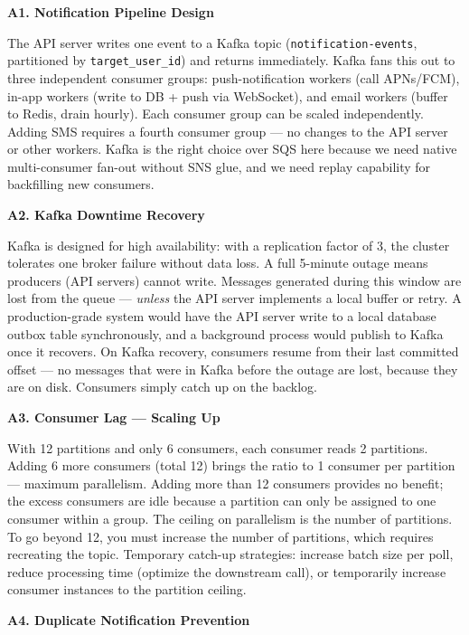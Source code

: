 \documentclass[11pt,a4paper]{article}
\begin{document}
\newpage
\begin{answerbox}
\textbf{A1. Notification Pipeline Design}

The API server writes one event to a Kafka topic (\texttt{notification-events}, partitioned by \texttt{target\_user\_id}) and returns immediately. Kafka fans this out to three independent consumer groups: push-notification workers (call APNs/FCM), in-app workers (write to DB + push via WebSocket), and email workers (buffer to Redis, drain hourly). Each consumer group can be scaled independently. Adding SMS requires a fourth consumer group --- no changes to the API server or other workers. Kafka is the right choice over SQS here because we need native multi-consumer fan-out without SNS glue, and we need replay capability for backfilling new consumers.

\vspace{0.8em}
\textbf{A2. Kafka Downtime Recovery}

Kafka is designed for high availability: with a replication factor of 3, the cluster tolerates one broker failure without data loss. A full 5-minute outage means producers (API servers) cannot write. Messages generated during this window are lost from the queue --- \textit{unless} the API server implements a local buffer or retry. A production-grade system would have the API server write to a local database outbox table synchronously, and a background process would publish to Kafka once it recovers. On Kafka recovery, consumers resume from their last committed offset --- no messages that were in Kafka before the outage are lost, because they are on disk. Consumers simply catch up on the backlog.

\vspace{0.8em}
\textbf{A3. Consumer Lag --- Scaling Up}

With 12 partitions and only 6 consumers, each consumer reads 2 partitions. Adding 6 more consumers (total 12) brings the ratio to 1 consumer per partition --- maximum parallelism. Adding more than 12 consumers provides no benefit; the excess consumers are idle because a partition can only be assigned to one consumer within a group. The ceiling on parallelism is the number of partitions. To go beyond 12, you must increase the number of partitions, which requires recreating the topic. Temporary catch-up strategies: increase batch size per poll, reduce processing time (optimize the downstream call), or temporarily increase consumer instances to the partition ceiling.

\vspace{0.8em}
\textbf{A4. Duplicate Notification Prevention}


\end{answerbox}
\end{document}
